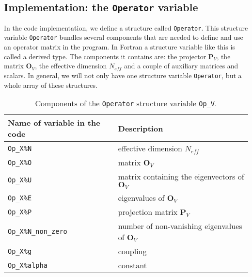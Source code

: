 \subsection{Implementation: the \texttt{Operator} variable}

In the code implementation, we define a structure called \texttt{Operator}. 
This structure variable \texttt{Operator} bundles several components that are needed to define and use an operator matrix in the program.
In Fortran a structure variable like this is called a derived type. 
The components it contains are: the projector ${\bm P}_{V}$, the matrix ${\bm O}_V$, the effective dimension $N_{eff}$ and a couple of auxiliary matrices and scalars.
In general, we will not only have one structure variable \texttt{Operator}, but a whole  array of these structures.

 

\begin{table}[h]
   \begin{tabular}{l l}
    Name of variable in the code & Description \\\hline
    \texttt{Op\_X\%N}            & effective dimension $N_{eff}$\\
    \texttt{Op\_X\%O}            &  matrix  $\mathbf{O}_{V}$\\
    \texttt{Op\_X\%U}            &  matrix containing the eigenvectors of $\mathbf{O}_{V}$  \\
    \texttt{Op\_X\%E}            &  eigenvalues of $\mathbf{O}_{V}$ \\
    \texttt{Op\_X\%P}            &  projection matrix $\mathbf{P}_{V}$ \\
    \texttt{Op\_X\%N\_non\_zero} &  number of non-vanishing eigenvalues of $\mathbf{O}_{V}$ \\
    \texttt{Op\_X\%g}            &    coupling \\  
    \texttt{Op\_X\%alpha}        &   constant   
   \end{tabular}
   \caption{Components of the \texttt{Operator} structure variable \texttt{Op\_V}.
   \label{tab:definitions}}
\end{table}